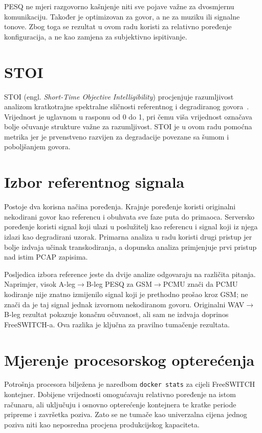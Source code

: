 PESQ ne mjeri razgovorno kašnjenje niti sve pojave važne za dvosmjernu komunikaciju. Također je optimizovan za govor, a ne za muziku ili signalne tonove. Zbog toga se rezultat u ovom radu koristi za relativno poređenje konfiguracija, a ne kao zamjena za subjektivno ispitivanje.

\section{STOI}

STOI (engl. \emph{Short-Time Objective Intelligibility}) procjenjuje razumljivost analizom kratkotrajne spektralne sličnosti referentnog i degradiranog govora~\cite{stoi}. Vrijednost je uglavnom u rasponu od 0 do 1, pri čemu viša vrijednost označava bolje očuvanje strukture važne za razumljivost. STOI je u ovom radu pomoćna metrika jer je prvenstveno razvijen za degradacije povezane sa šumom i poboljšanjem govora.

\section{Izbor referentnog signala}

Postoje dva korisna načina poređenja. Krajnje poređenje koristi originalni nekodirani govor kao referencu i obuhvata sve faze puta do primaoca. Serversko poređenje koristi signal koji ulazi u poslužitelj kao referencu i signal koji iz njega izlazi kao degradirani uzorak. Primarna analiza u radu koristi drugi pristup jer bolje izdvaja učinak transkodiranja, a dopunska analiza primjenjuje prvi pristup nad istim PCAP zapisima.

Posljedica izbora reference jeste da dvije analize odgovaraju na različita pitanja. Naprimjer, visok A-leg$\rightarrow$B-leg PESQ za GSM$\rightarrow$PCMU znači da PCMU kodiranje nije znatno izmijenilo signal koji je prethodno prošao kroz GSM; ne znači da je taj signal jednak izvornom nekodiranom govoru. Originalni WAV$\rightarrow$B-leg rezultat pokazuje konačnu očuvanost, ali sam ne izdvaja doprinos FreeSWITCH-a. Ova razlika je ključna za pravilno tumačenje rezultata.

\section{Mjerenje procesorskog opterećenja}

Potrošnja procesora bilježena je naredbom \texttt{docker stats} za cijeli FreeSWITCH kontejner. Dobijene vrijednosti omogućavaju relativno poređenje na istom računaru, ali uključuju i osnovno opterećenje kontejnera te kratke periode pripreme i završetka poziva. Zato se ne tumače kao univerzalna cijena jednog poziva niti kao neposredna procjena produkcijskog kapaciteta.
